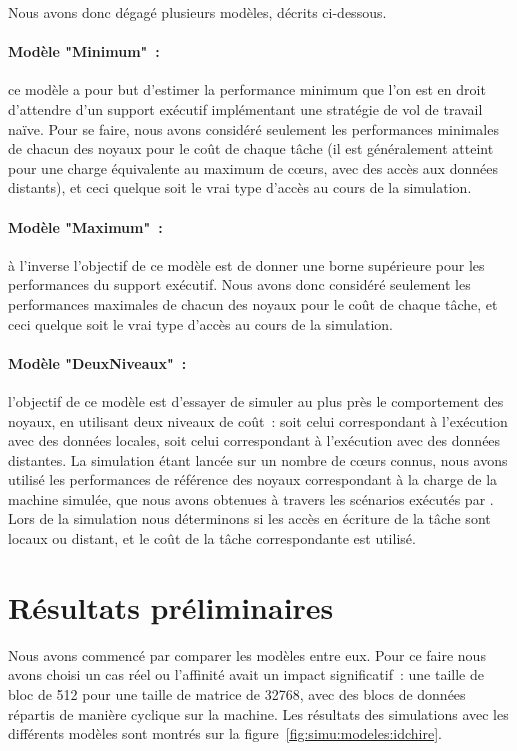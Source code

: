 Nous avons donc dégagé plusieurs modèles, décrits ci-dessous.

\paragraph{Modèle "Minimum"~:} ce modèle a pour but d'estimer la performance minimum que l'on est en droit d'attendre d'un support exécutif implémentant une stratégie de vol de travail naïve.
Pour se faire, nous avons considéré seulement les performances minimales de chacun des noyaux pour le coût de chaque tâche (il est généralement atteint pour une charge équivalente au maximum de cœurs, avec des accès aux données distants), et ceci quelque soit le vrai type d'accès au cours de la simulation.

\paragraph{Modèle "Maximum"~:} à l'inverse l'objectif de ce modèle est de donner une borne supérieure pour les performances du support exécutif.
Nous avons donc considéré seulement les performances maximales de chacun des noyaux pour le coût de chaque tâche, et ceci quelque soit le vrai type d'accès au cours de la simulation.

\paragraph{Modèle "DeuxNiveaux"~:} l'objectif de ce modèle est d'essayer de simuler au plus près le comportement des noyaux, en utilisant deux niveaux de coût~: soit celui correspondant à l'exécution avec des données locales, soit celui correspondant à l'exécution avec des données distantes.
La simulation étant lancée sur un nombre de cœurs connus, nous avons utilisé les performances de référence des noyaux correspondant à la charge de la machine simulée, que nous avons obtenues à travers les scénarios exécutés par \outil.
Lors de la simulation nous déterminons si les accès en écriture de la tâche sont locaux ou distant, et le coût de la tâche correspondante est utilisé.




\section{Résultats préliminaires}\label{sec:simulation:resultats}


Nous avons commencé par comparer les modèles entre eux.
Pour ce faire nous avons choisi un cas réel ou l'affinité avait un impact significatif~: une taille de bloc de 512 pour une taille de matrice de 32768, avec des blocs de données répartis de manière cyclique sur la machine.
Les résultats des simulations avec les différents modèles sont montrés sur la figure~\ref{fig:simu:modeles:idchire}.

